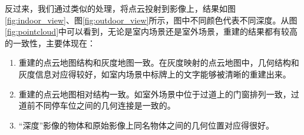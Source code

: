\begin{algorithm}[htbp]
  \label{alg:color_map}
  \caption{}
  \LinesNumbered 
\end{algorithm}

反过来，我们通过类似的处理，将点云投射到影像上，结果如图\ref{fig:indoor_view}、图\ref{fig:outdoor_view}所示，图中不同颜色代表不同深度。从图\ref{fig:pointcloud}中可以看到，无论是室内场景还是室外场景，重建的结果都有较高的一致性，主要体现在：
\begin{enumerate}
  \item 重建的点云地图结构和灰度地图一致。在灰度映射的点云地图中，几何结构和灰度信息对应得较好，如室内场景中标牌上的文字能够被清晰的重建出来。
  
  \item 重建的点云地图相对结构一致。如室外场景中位于过道上的门窗排列一致，过道前不同停车位之间的几何连接是一致的。
  
  \item “深度”影像的物体和原始影像上同名物体之间的几何位置对应得很好。
\end{enumerate}

